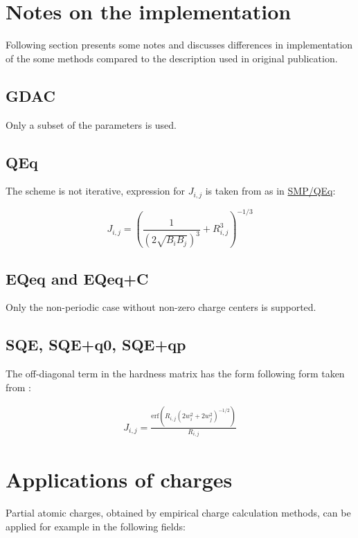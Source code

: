 \documentclass[oneside]{memoir}
\newcommand\ddfrac[2]{\frac{\displaystyle #1}{\displaystyle #2}}
\begin{document}
\chapter*{Notes on the implementation}

Following section presents some notes and discusses differences in implementation of the some methods compared to the description used in original publication.

\section*{GDAC}
Only a subset of the parameters is used.

\section*{QEq}
The scheme is not iterative, expression for $J_{i,j}$ is taken from \cite{Louwen1998} as in \hyperref[sec:methods_smpqeq]{SMP/QEq}:

\begin{equation}
\label{eq:qeq_louwen}
J_{i, j} = \left(\ddfrac{1}{(2\sqrt{B_iB_j})^3} + R_{i,j}^3\right)^{-1/3}
\end{equation}

\section*{EQeq and EQeq+C}
Only the non-periodic case without non-zero charge centers is supported.

\section*{SQE, SQE+q0, SQE+qp}
The off-diagonal term in the hardness matrix has the form following form taken from \cite{Verstraelen2013}:

\begin{gather}
J_{i, j} = \frac{\mathrm{erf}{\left(R_{i, j}{({2w_i^2 + 2w_j^2})^{-1/2}}\right)}}{R_{i, j}}
\end{gather}

\chapter*{Applications of charges}

Partial atomic charges, obtained by empirical charge calculation methods, can be applied for example in the following fields:
\end{document}
